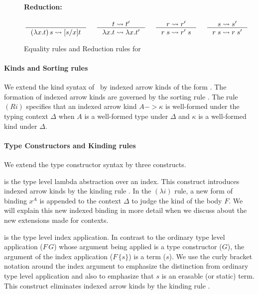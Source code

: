 \begin{figure}
\begin{framed}
\paragraph{Reduction:}
\[ \inference{}{(\lambda x.t)\,s \rightsquigarrow [s/x]t}
 ~~~~
   \inference{t \rightsquigarrow t'}{\lambda x.t \rightsquigarrow \lambda x.t'}
 ~~~~
   \inference{r \rightsquigarrow r'}{r\;s \rightsquigarrow r'\;s}
 ~~~~
   \inference{s \rightsquigarrow s'}{r\;s \rightsquigarrow r\;s'}
\]
\end{framed}
\caption{Equality rules and Reduction rules for \Fi}
\label{fig:eqFi}
\end{figure}

\paragraph{Kinds and Sorting rules}
We extend the kind syntax of \Fw\ by indexed arrow kinds of the form
. The formation of indexed arrow kinds are
governed by the sorting rule .
The rule $(Ri)$ specifies that an indexed arrow kind $A -> \kappa$
is well-formed under the typing context $\Delta$
when $A$ is a well-formed type under $\Delta$
and $\kappa$ is a well-formed kind under $\Delta$.

\paragraph{Type Constructors and Kinding rules}
We extend the type constructor syntax by three constructs.

 is the type level lambda abstraction over an index.
This construct introduces indexed arrow kinds by the kinding rule
. In the $(\lambda i)$ rule, a new form of binding
$x^A$ is appended to the context $\Delta$ to judge the kind of the body $F$.
We will explain this new indexed binding in more detail when we discuss about
the new extensions made for contexts.

 is the type level index application.
In contrast to the ordinary type level application ($F\,G$) whose argument being
applied is a type constructor ($G$), the argument of the index application
($F\,\{s\}$) is a term ($s$). We use the curly bracket notation around
the index argument to emphasize the distinction from ordinary type level
application and also to emphasize that $s$ is an erasable (or static) term.
This construct eliminates indexed arrow kinds by the kinding rule .

